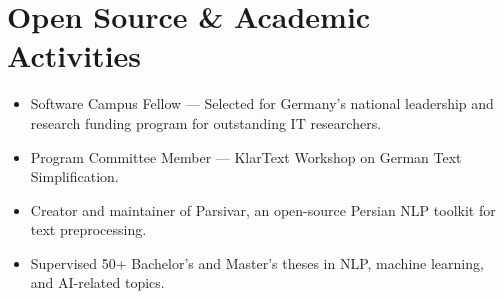\documentclass[11pt,a4paper]{article}
\newcommand{\cvitem}[1]{
    \item #1
}
\begin{document}
\vspace{0.7em}

\section*{Open Source \& Academic Activities}

\begin{itemize}
    \cvitem{Software Campus Fellow — Selected for Germany’s national leadership and research funding program for outstanding IT researchers.}

    \cvitem{Program Committee Member — KlarText Workshop on German Text Simplification.}

    \cvitem{Creator and maintainer of Parsivar, an open-source Persian NLP toolkit for text preprocessing.}

    \cvitem{Supervised 50+ Bachelor’s and Master’s theses in NLP, machine learning, and AI-related topics.}

\end{itemize}
\end{document}
